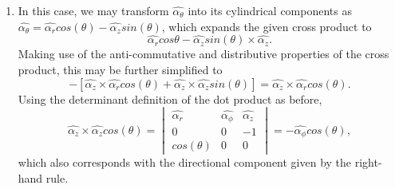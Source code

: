 \documentclass{article}
\begin{document}
\begin{enumerate}
\begin{enumerate}[label=\alph*)]
  \item In this case, we may transform \(\hat{\alpha_{\theta}}\) into its cylindrical components as \(\hat{\alpha_{\theta}}=\hat{\alpha_r}cos(\theta) - \hat{\alpha_z}sin(\theta)\), which expands the given cross product to \[
		\hat{\alpha_r}cos\theta - \hat{\alpha_z}sin(\theta) \times \hat{\alpha_z}. 
\]
	Making use of the anti-commutative and distributive properties of the cross product, this may be further simplified to \[
		-[\hat{\alpha_z} \times \hat{\alpha_r}cos(\theta) + \hat{\alpha_z} \times \hat{\alpha_z}sin(\theta)] = \hat{\alpha_z} \times \hat{\alpha_r}cos(\theta). 
	\]
	Using the determinant definition of the dot product as before,\[
		\hat{\alpha_z} \times \hat{\alpha_z}cos(\theta)=\begin{vmatrix}
			\hat{\alpha_r} & \hat{\alpha_{\phi}} & \hat{\alpha_z} \\
			0 & 0 & -1 \\
			cos(\theta) & 0 & 0 
		\end{vmatrix} = -\hat{\alpha_{\phi}}cos(\theta),
	\]
	which also corresponds with the directional component given by the right-hand rule. 


\end{enumerate}
\end{enumerate}
\end{document}
